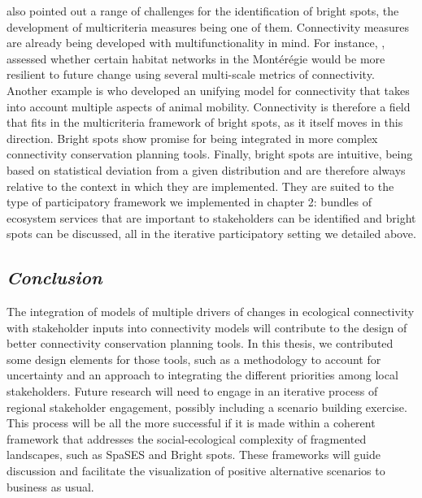 \documentclass[12pt,Bold,TexShade]{thesis/mcgilletdclass}
\begin{document}
{\citeauthor{frei_bright_2018} also pointed out a range of challenges for the identification of bright spots, the development of multicriteria measures being one of them. Connectivity measures are already being developed with  multifunctionality in mind. For instance, \cite{rayfield_priorisation_2018}, assessed whether certain habitat networks in the Montérégie would be more resilient to future change using several multi-scale metrics of connectivity. Another example is \cite{fletcher_towards_2019} who developed an unifying model for connectivity that takes into account multiple aspects of animal mobility. Connectivity is therefore a field that fits in the multicriteria framework of bright spots, as it itself moves in this direction. Bright spots show promise for being integrated in more complex connectivity conservation planning tools. Finally, bright spots are intuitive, being based on statistical deviation from a given distribution and are therefore always relative to the context in which they are implemented. They are suited to the type of participatory framework we implemented in chapter 2: bundles of ecosystem services that are important to stakeholders can be identified and bright spots can be discussed, all in the iterative participatory setting we detailed above. \\

\vspace{3em}

\subsection*{\textit{Conclusion \\ \vspace{2em}}}

The integration of models of multiple drivers of changes in ecological connectivity with stakeholder inputs into connectivity models will contribute to the design of better connectivity conservation planning tools. In this thesis, we contributed some design elements for those tools, such as a methodology to account for uncertainty and an approach to integrating the different  priorities among local stakeholders. Future research will need to engage in an iterative process of regional stakeholder engagement, possibly including a scenario building exercise. This process will be all the more successful if it is made within a coherent framework that addresses the social-ecological complexity of fragmented landscapes, such as SpaSES and Bright spots. These frameworks will guide discussion and facilitate the visualization of positive alternative scenarios to business as usual. \\
}%

\Disc%

%




\printbibliography[heading=bibintoc, section=0, title={General Bibliography \vspace{1em}}]
\end{document}
